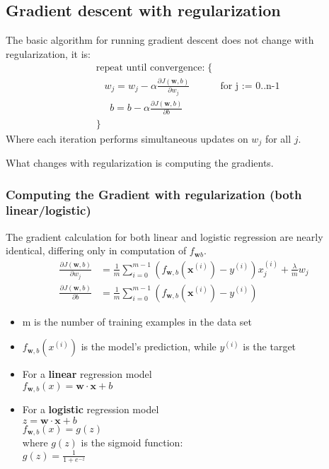 \documentclass[11pt]{article}
\begin{document}
    \hypertarget{gradient-descent-with-regularization}{%
\subsection{Gradient descent with
regularization}\label{gradient-descent-with-regularization}}

The basic algorithm for running gradient descent does not change with
regularization, it is: \[\begin{align*}
&\text{repeat until convergence:} \; \lbrace \\
&  \; \; \;w_j = w_j -  \alpha \frac{\partial J(\mathbf{w},b)}{\partial w_j} \tag{1}  \; & \text{for j := 0..n-1} \\ 
&  \; \; \;  \; \;b = b -  \alpha \frac{\partial J(\mathbf{w},b)}{\partial b} \\
&\rbrace
\end{align*}\] Where each iteration performs simultaneous updates on
\(w_j\) for all \(j\).

What changes with regularization is computing the gradients.

    \hypertarget{computing-the-gradient-with-regularization-both-linearlogistic}{%
\subsubsection{Computing the Gradient with regularization (both
linear/logistic)}\label{computing-the-gradient-with-regularization-both-linearlogistic}}

The gradient calculation for both linear and logistic regression are
nearly identical, differing only in computation of \(f_{\mathbf{w}b}\).
\[\begin{align*}
\frac{\partial J(\mathbf{w},b)}{\partial w_j}  &= \frac{1}{m} \sum\limits_{i = 0}^{m-1} (f_{\mathbf{w},b}(\mathbf{x}^{(i)}) - y^{(i)})x_{j}^{(i)}  +  \frac{\lambda}{m} w_j \tag{2} \\
\frac{\partial J(\mathbf{w},b)}{\partial b}  &= \frac{1}{m} \sum\limits_{i = 0}^{m-1} (f_{\mathbf{w},b}(\mathbf{x}^{(i)}) - y^{(i)}) \tag{3} 
\end{align*}\]

\begin{itemize}
\item
  m is the number of training examples in the data set\\
\item
  \(f_{\mathbf{w},b}(x^{(i)})\) is the model's prediction, while
  \(y^{(i)}\) is the target
\item
  For a { \textbf{linear} } regression model\\
  \(f_{\mathbf{w},b}(x) = \mathbf{w} \cdot \mathbf{x} + b\)\\
\item
  For a { \textbf{logistic} } regression model\\
  \(z = \mathbf{w} \cdot \mathbf{x} + b\)\\
  \(f_{\mathbf{w},b}(x) = g(z)\)\\
  where \(g(z)\) is the sigmoid function:\\
  \(g(z) = \frac{1}{1+e^{-z}}\)
\end{itemize}
\end{document}
